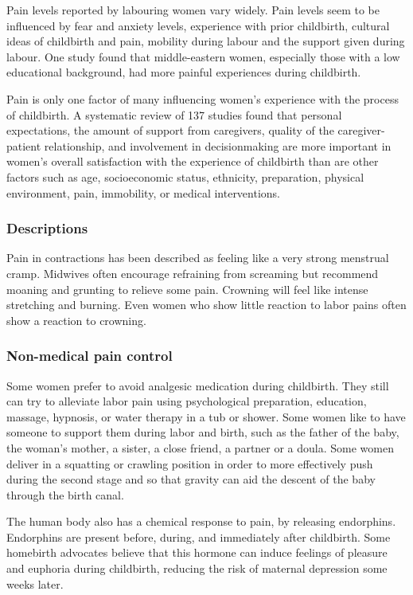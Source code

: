 \documentclass[12pt,a4paper,onecolumn]{article}
\begin{document}
Pain levels reported by labouring women vary widely. Pain levels seem to be influenced by fear and
anxiety levels, experience with prior childbirth, cultural ideas of childbirth and pain, mobility
during labour and the support given during labour. One study found that middle-eastern women,
especially those with a low educational background, had more painful experiences during childbirth.

Pain is only one factor of many influencing women's experience with the process of childbirth. A
systematic review of 137 studies found that personal expectations, the amount of support from
caregivers, quality of the caregiver-patient relationship, and involvement in decisionmaking are
more important in women's overall satisfaction with the experience of childbirth than are other
factors such as age, socioeconomic status, ethnicity, preparation, physical environment, pain,
immobility, or medical interventions.

\subsubsection{Descriptions}

Pain in contractions has been described as feeling like a very strong menstrual cramp. Midwives
often encourage refraining from screaming but recommend moaning and grunting to relieve some pain.
Crowning will feel like intense stretching and burning. Even women who show little reaction to labor
pains often show a reaction to crowning.

\subsubsection{Non-medical pain control}

Some women prefer to avoid analgesic medication during childbirth. They still can try to alleviate
labor pain using psychological preparation, education, massage, hypnosis, or water therapy in a tub
or shower. Some women like to have someone to support them during labor and birth, such as the
father of the baby, the woman's mother, a sister, a close friend, a partner or a doula. Some women
deliver in a squatting or crawling position in order to more effectively push during the second
stage and so that gravity can aid the descent of the baby through the birth canal.

The human body also has a chemical response to pain, by releasing endorphins. Endorphins are present
before, during, and immediately after childbirth. Some homebirth advocates believe that this hormone
can induce feelings of pleasure and euphoria during childbirth, reducing the risk of maternal
depression some weeks later.
\end{document}
